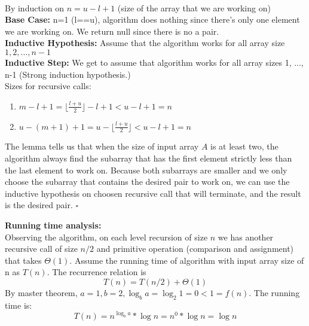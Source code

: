 \documentclass{article}
\begin{document}
\\By induction on $n = u-l+1$ (size of the array that we are working on)
\\\textbf{Base Case:} n=1 (l==u), algorithm does nothing since there's only one element we are working on. We return null since there is no a pair.
\\\textbf{Inductive Hypothesis:} Assume that the algorithm works for all array size $1, 2, ..., n-1$
\\\textbf{Inductive Step:} We get to assume that algorithm works
for all array sizes 1, ..., n-1 (Strong induction hypothesis.) 
\\Sizes for recursive calls:
\begin{enumerate}
    \item $m-l+1 = \lfloor \frac{l+u}{2}\rfloor - l + 1 < u-l+1=n$
    \item $u-(m+1)+1 = u-\lfloor \frac{l+u}{2}\rfloor < u-l+1=n$
\end{enumerate}

The lemma tells us that when the size of input array $A$ is at least two, the algorithm always find the subarray that has the first element strictly less than the last element to work on. Because both subarrays are smaller and we only choose the subarray that contains the desired pair to work on, we can use the inductive hypothesis on choosen recursive call that will terminate, and the result is the desired pair. $\square$

\textbf{Running time analysis:}\\
Observing the algorithm, on each level recursion of size $n$ we has another recursive call of size $n/2$ and primitive operation (comparison and assignment) that takes $\Theta(1)$. Assume the running time of algorithm with input array size of n as $T(n)$. The recurrence relation is \[T(n)=T(n/2)+\Theta(1)\]
By master theorem, $a = 1, b = 2, \log_b{a} = \log_2{1} = 0 < 1 = f(n)$. The running time is: \[T(n) = n^{\log_b{a}}*\log{n} = n^0*\log{n} = \log{n}\]
\end{document}
